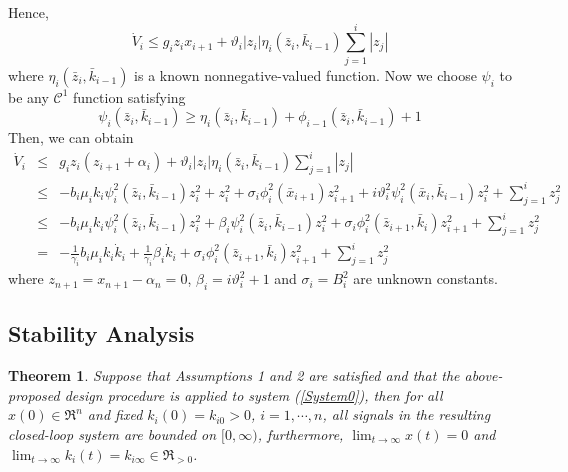 \documentclass{tSYS2e}
\theoremstyle{plain}
\newtheorem{theorem}{Theorem}
\theoremstyle{definition}
\begin{document}
Hence,
\begin{equation}
\dot{V}_{i}\leq g_{i}z_{i}x_{i+1}+\vartheta _{i}\left\vert z_{i}\right\vert
\eta _{i}(\bar{z}_{i},\bar{k}_{i-1})\sum_{j=1}^{i}\left\vert
z_{j}\right\vert  \label{Vidot2}
\end{equation}
where $\eta _{i}(\bar{z}_{i},\bar{k}_{i-1})$ is a known nonnegative-valued
function. Now we choose $\psi _{i}$ to be any $\mathcal{C}^{1}$ function satisfying
\begin{equation}
\psi _{i}(\bar{z}_{i},\bar{k}_{i-1})\geq \eta _{i}(\bar{z}_{i},\bar{k}
_{i-1})+\phi _{i-1}(\bar{z}_{i},\bar{k}_{i-1})+1  \label{psii}
\end{equation}
Then, we can obtain
\begin{eqnarray}
\dot{V}_{i} &\leq &g_{i}z_{i}(z_{i+1}+\alpha _{i})+\vartheta _{i}\left\vert
z_{i}\right\vert \eta _{i}(\bar{z}_{i},\bar{k}_{i-1})\sum_{j=1}^{i}
\left\vert z_{j}\right\vert   \nonumber \\
&\leq &-b_{i}\mu _{i}k_{i}\psi _{i}^{2}(\bar{z}_{i},\bar{k}
_{i-1})z_{i}^{2}+z_{i}^{2}+\sigma _{i}\phi _{i}^{2}(\bar{x}
_{i+1})z_{i+1}^{2}+i\vartheta _{i}^{2}\psi _{i}^{2}(\bar{x}_{i},\bar{k}
_{i-1})z_{i}^{2}+\sum_{j=1}^{i}z_{j}^{2}  \nonumber \\
&\leq &-b_{i}\mu _{i}k_{i}\psi _{i}^{2}(\bar{z}_{i},\bar{k}
_{i-1})z_{i}^{2}+\beta _{i}\psi _{i}^{2}(\bar{z}_{i},\bar{k}
_{i-1})z_{i}^{2}+\sigma _{i}\phi _{i}^{2}(\bar{z}_{i+1},\bar{k}
_{i})z_{i+1}^{2}+\sum_{j=1}^{i}z_{j}^{2}  \nonumber \\
&=&-\frac{1}{\gamma _{i}}b_{i}\mu _{i}k_{i}\dot{k}_{i}+\frac{1}{\gamma _{i}}
\beta _{i}\dot{k}_{i}+\sigma _{i}\phi _{i}^{2}(\bar{z}_{i+1},\bar{k}
_{i})z_{i+1}^{2}+\sum_{j=1}^{i}z_{j}^{2}  \label{Vidot}
\end{eqnarray}
where $z_{n+1}=x_{n+1}-\alpha _{n}=0$, $\beta _{i} =i\vartheta _{i}^{2}+1$ and $\sigma _{i} =B_{i}^{2}$
are unknown constants.

\subsection{Stability Analysis}

\begin{theorem}
Suppose that Assumptions 1 and 2 are satisfied and that the above-proposed
design procedure is applied to system (\ref{System0}), then for all $x(0)\in
\Re ^{n}$ and fixed $k_{i}(0)=k_{i0}>0$, $i=1,\cdots ,n$, all signals in
the resulting closed-loop system are bounded on $[0,\infty )$, furthermore, $
\lim_{t\rightarrow \infty }x(t)=0$ and $\lim_{t\rightarrow \infty }k_{i}(t)=
k_{i\infty}\in \Re _{>0}$.
\end{theorem}
\end{document}
